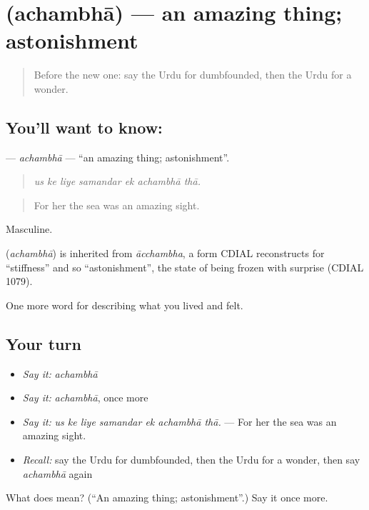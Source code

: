 \section[\texorpdfstring{\ur{اچنبھا} (achambhā)}{اچنبھا (achambhā)}]{ (achambhā) — an amazing thing; astonishment}

\label{lesson:UR-C442-achambha}



\begin{quote}
Before the new one: say the Urdu for dumbfounded, then the Urdu for a wonder.
\end{quote}

\subsection*{You'll want to know: }
\textbf{} — \emph{achambhā} — \textquotedblleft{}an amazing thing; astonishment\textquotedblright{}.

\begin{quote}
      
\end{quote}

\begin{quote}
\emph{us ke liye samandar ek achambhā thā.}
\end{quote}

\begin{quote}
For her the sea was an amazing sight.
\end{quote}

Masculine.

\begin{cousinweb}
\textbf{} (\emph{achambhā}) is inherited from \emph{ācchambha}, a form CDIAL reconstructs for \textquotedblleft{}stiffness\textquotedblright{} and so \textquotedblleft{}astonishment\textquotedblright{}, the state of being frozen with surprise (CDIAL 1079).
\end{cousinweb}

\begin{grammarlens}[title={What you've built}]
One more word for describing what you lived and felt.
\end{grammarlens}

\subsection*{Your turn}
\begin{itemize}
\raggedright
  \item \emph{Say it:} \emph{achambhā}
  \item \emph{Say it:} \emph{achambhā}, once more
  \item \emph{Say it:} \emph{us ke liye samandar ek achambhā thā.} — For her the sea was an amazing sight.
  \item \emph{Recall:} say the Urdu for dumbfounded, then the Urdu for a wonder, then say \emph{achambhā} again
\end{itemize}

\begin{tcolorbox}[breakable,colback=teal!4,colframe=teal!35!black,title={Before you move on}]
What does  mean? (\textquotedblleft{}An amazing thing; astonishment\textquotedblright{}.) Say it once more.
\end{tcolorbox}
